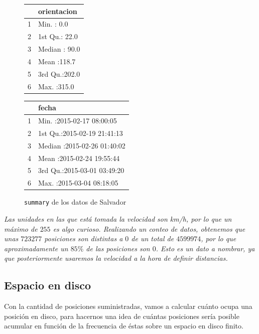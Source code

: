 \documentclass[a4paper, 12pt, spanish]{article}
\begin{document}
\begin{figure}

\begin{center}
\begin{minipage}[t]{.3\textwidth}
	\begin{tabular}{rl}
  \hline
 &       orientacion \\ 
  \hline
1 & Min.   :  0.0   \\ 
  2 & 1st Qu.: 22.0   \\ 
  3 & Median : 90.0   \\ 
  4 & Mean   :118.7   \\ 
  5 & 3rd Qu.:202.0   \\ 
  6 & Max.   :315.0   \\ 
   \hline
\end{tabular}
\end{minipage}\hfil
\begin{minipage}[t]{.5\textwidth}
	\begin{tabular}{rl}
  \hline
 &       fecha \\ 
  \hline
1 & Min.   :2015-02-17 08:00:05   \\ 
  2 & 1st Qu.:2015-02-19 21:41:13   \\ 
  3 & Median :2015-02-26 01:40:02   \\ 
  4 & Mean   :2015-02-24 19:55:44   \\ 
  5 & 3rd Qu.:2015-03-01 03:49:20   \\ 
  6 & Max.   :2015-03-04 08:18:05   \\ 
   \hline
\end{tabular}
\end{minipage}
\end{center}
\caption{\texttt{summary} de los datos de Salvador}
\end{figure}

\textit{Las unidades en las que est\'a tomada la velocidad son km/h, por lo que un m\'aximo de $255$ es algo curioso. Realizando un conteo de datos, obtenemos que unas $723277$ posiciones son distintas a $0$ de un total de $4599974$, por lo que aproximadamente un $85\%$ de las posiciones son $0$. Esto es un dato a nombrar, ya que posteriormente usaremos la velocidad a la hora de definir distancias.}

\pagebreak
\subsection{Espacio en disco}

Con la cantidad de posiciones suministradas, vamos a calcular cu\'anto ocupa una posici\'on en disco, para hacernos una idea de cu\'antas posiciones ser\'ia posible acumular en funci\'on de la frecuencia de \'estas sobre un espacio en disco finito.\\
\end{document}
